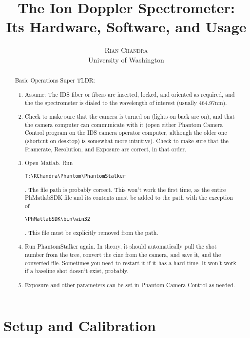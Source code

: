 \documentclass[twoside]{article}
\title{\vspace{-15mm}\fontsize{24pt}{10pt}
	\selectfont\textbf{The Ion Doppler Spectrometer: \\ Its Hardware, Software, and Usage }}
\author{ \large\textsc{Rian Chandra}\\[2mm]
	\normalsize University of Washington
	\vspace{-5mm}
}
\date{}
\begin{document}
	\setlength{\parindent}{.25in}
	\maketitle
	
	
	\begin{abstract}
	Basic Operations Super TLDR:
	\begin{enumerate}
		\item{Assume: The IDS fiber or fibers are inserted, locked, and oriented as required, and the the spectrometer is dialed to the wavelength of interest (usually 464.97nm).}
		\item{Check to make sure that the camera is turned on (lights on back are on), and that the camera computer can communicate with it (open either Phantom Camera Control program on the IDS camera operator computer, although the older one (shortcut on desktop) is somewhat more intuitive). Check to make sure that the Framerate, Resolution, and Exposure are correct, in that order.}
		\item{Open Matlab. Run \begin{verbatim}T:\RChandra\Phantom\PhantomStalker\end{verbatim}. The file path is probably correct. This won’t work the first time, as the entire PhMatlabSDK file and its contents must be added to the path with the exception of \begin{verbatim}\PhMatlabSDK\bin\win32\end{verbatim}. This file must be explicitly removed from the path.}
		\item{Run PhantomStalker again. In theory, it should automatically pull the shot number from the tree, convert the cine from the camera, and save it, and the converted file. Sometimes you need to restart it if it has a hard time. It won't work if a baseline shot doesn't exist, probably.}
		\item Exposure and other parameters can be set in Phantom Camera Control as needed. 
	\end{enumerate}
		
	\end{abstract}



\section{Setup and Calibration}
\end{document}
